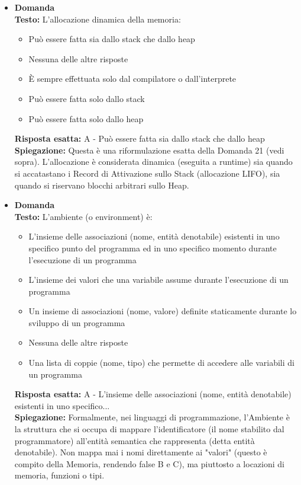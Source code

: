 \documentclass[12pt, a4paper]{article}
\newcounter{domandateoria}
\begin{document}
\begin{itemize}
    \item {}\textbf{Domanda \thedomandateoria} \\
    \textbf{Testo:} L'allocazione dinamica della memoria:
    \begin{itemize}
        \item[A)] Può essere fatta sia dallo stack che dallo heap
        \item[B)] Nessuna delle altre risposte
        \item[C)] È sempre effettuata solo dal compilatore o dall'interprete
        \item[D)] Può essere fatta solo dallo stack
        \item[E)] Può essere fatta solo dallo heap
    \end{itemize}
    \textbf{Risposta esatta:} A - Può essere fatta sia dallo stack che dallo heap \\
    \textbf{Spiegazione:} Questa è una riformulazione esatta della Domanda 21 (vedi sopra). L'allocazione è considerata dinamica (eseguita a runtime) sia quando si accatastano i Record di Attivazione sullo Stack (allocazione LIFO), sia quando si riservano blocchi arbitrari sullo Heap. 
    \vspace{0.3cm}

\newpage

    \item {}\textbf{Domanda \thedomandateoria} \\
    \textbf{Testo:} L'ambiente (o environment) è:
    \begin{itemize}
        \item[A)] L'insieme delle associazioni (nome, entità denotabile) esistenti in uno specifico punto del programma ed in uno specifico momento durante l'esecuzione di un programma
        \item[B)] L'insieme dei valori che una variabile assume durante l'esecuzione di un programma
        \item[C)] Un insieme di associazioni (nome, valore) definite staticamente durante lo sviluppo di un programma
        \item[D)] Nessuna delle altre risposte
        \item[E)] Una lista di coppie (nome, tipo) che permette di accedere alle variabili di un programma
    \end{itemize}
    \textbf{Risposta esatta:} A - L'insieme delle associazioni (nome, entità denotabile) esistenti in uno specifico... \\
    \textbf{Spiegazione:} Formalmente, nei linguaggi di programmazione, l'Ambiente è la struttura che si occupa di mappare l'identificatore (il nome stabilito dal programmatore) all'entità semantica che rappresenta (detta entità denotabile). Non mappa mai i nomi direttamente ai "valori" (questo è compito della Memoria, rendendo false B e C), ma piuttosto a locazioni di memoria, funzioni o tipi.
    \vspace{0.3cm}


\end{itemize}
\end{document}
